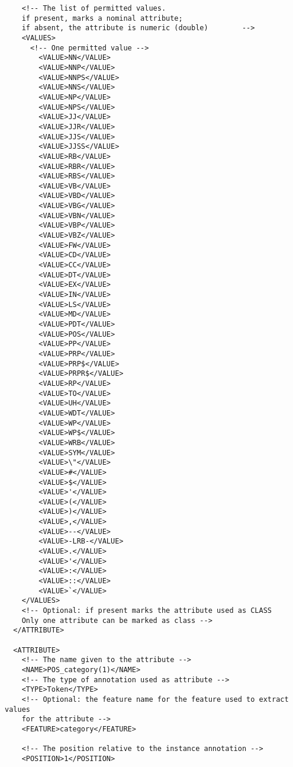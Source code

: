 \begin{verbatim}
    <!-- The list of permitted values.
    if present, marks a nominal attribute;
    if absent, the attribute is numeric (double)        -->
    <VALUES>
      <!-- One permitted value -->
        <VALUE>NN</VALUE>
        <VALUE>NNP</VALUE>
        <VALUE>NNPS</VALUE>
        <VALUE>NNS</VALUE>
        <VALUE>NP</VALUE>
        <VALUE>NPS</VALUE>
        <VALUE>JJ</VALUE>
        <VALUE>JJR</VALUE>
        <VALUE>JJS</VALUE>
        <VALUE>JJSS</VALUE>
        <VALUE>RB</VALUE>
        <VALUE>RBR</VALUE>
        <VALUE>RBS</VALUE>
        <VALUE>VB</VALUE>
        <VALUE>VBD</VALUE>
        <VALUE>VBG</VALUE>
        <VALUE>VBN</VALUE>
        <VALUE>VBP</VALUE>
        <VALUE>VBZ</VALUE>
        <VALUE>FW</VALUE>
        <VALUE>CD</VALUE>
        <VALUE>CC</VALUE>
        <VALUE>DT</VALUE>
        <VALUE>EX</VALUE>
        <VALUE>IN</VALUE>
        <VALUE>LS</VALUE>
        <VALUE>MD</VALUE>
        <VALUE>PDT</VALUE>
        <VALUE>POS</VALUE>
        <VALUE>PP</VALUE>
        <VALUE>PRP</VALUE>
        <VALUE>PRP$</VALUE>
        <VALUE>PRPR$</VALUE>
        <VALUE>RP</VALUE>
        <VALUE>TO</VALUE>
        <VALUE>UH</VALUE>
        <VALUE>WDT</VALUE>
        <VALUE>WP</VALUE>
        <VALUE>WP$</VALUE>
        <VALUE>WRB</VALUE>
        <VALUE>SYM</VALUE>
        <VALUE>\"</VALUE>
        <VALUE>#</VALUE>
        <VALUE>$</VALUE>
        <VALUE>'</VALUE>
        <VALUE>(</VALUE>
        <VALUE>)</VALUE>
        <VALUE>,</VALUE>
        <VALUE>--</VALUE>
        <VALUE>-LRB-</VALUE>
        <VALUE>.</VALUE>
        <VALUE>'</VALUE>
        <VALUE>:</VALUE>
        <VALUE>::</VALUE>
        <VALUE>`</VALUE>
    </VALUES>
    <!-- Optional: if present marks the attribute used as CLASS
    Only one attribute can be marked as class -->
  </ATTRIBUTE>

  <ATTRIBUTE>
    <!-- The name given to the attribute -->
    <NAME>POS_category(1)</NAME>
    <!-- The type of annotation used as attribute -->
    <TYPE>Token</TYPE>
    <!-- Optional: the feature name for the feature used to extract values
    for the attribute -->
    <FEATURE>category</FEATURE>

    <!-- The position relative to the instance annotation -->
    <POSITION>1</POSITION>


\end{verbatim}
